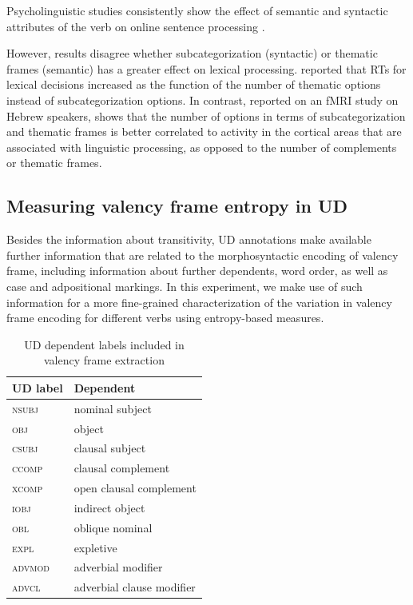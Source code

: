 \citet{marslen-wilson1990,segui1982}
Psycholinguistic studies consistently show the effect of semantic and syntactic attributes of the verb on online sentence processing \citep{shapiro1987,collina2001}. 

However, results disagree whether subcategorization (syntactic) or thematic frames (semantic) has a greater effect on lexical processing. \citet{shapiro1987} reported that RTs for lexical decisions increased as the function of the number of thematic options instead of subcategorization options. In contrast, \citet{shetreet2007} reported on an fMRI study on Hebrew speakers, shows that the number of options in terms of subcategorization and thematic frames is better correlated to activity in the cortical areas that are associated with linguistic processing, as opposed to the number of complements or thematic frames.


\subsection{Measuring valency frame entropy in UD}

Besides the information about transitivity, UD annotations make available further information that are related to the morphosyntactic encoding of valency frame, including information about further dependents, word order, as well as case and adpositional markings. In this experiment, we make use of such information for a more fine-grained characterization of the variation in valency frame encoding for different verbs using entropy-based measures.

\begin{table}
  \centering
  \begin{tabular}{ll}
    \toprule
    \textbf{UD label} & \textbf{Dependent} \\
    \midrule
    \textsc{nsubj} & nominal subject \\
    \textsc{obj} & object \\
    \textsc{csubj} & clausal subject \\
    \textsc{ccomp} & clausal complement \\
    \textsc{xcomp}   & open clausal complement \\
    \midrule
    \textsc{iobj} & indirect object \\
    \textsc{obl} & oblique nominal \\
    \textsc{expl} & expletive \\
    \textsc{advmod} & adverbial modifier \\
    \textsc{advcl} & adverbial clause modifier \\
    \bottomrule
  \end{tabular}
  \caption{UD dependent labels included in valency frame extraction}\label{tab:ud-dependent-labels}
\end{table}

